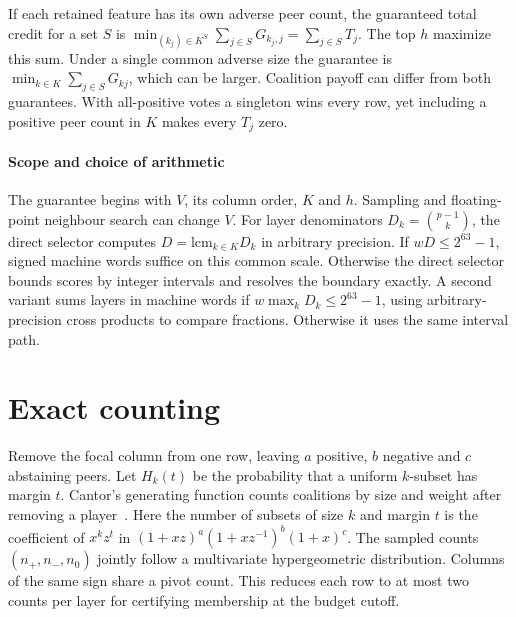 \documentclass{article}
\begin{document}
If each retained feature has its own adverse peer count, the guaranteed total credit for a set $S$ is $\min_{(k_j)\in K^S}\sum_{j\in S}G_{k_j,j}=\sum_{j\in S}T_j$. The top $h$ maximize this sum. Under a single common adverse size the guarantee is $\min_{k\in K}\sum_{j\in S}G_{kj}$, which can be larger. Coalition payoff can differ from both guarantees. With all-positive votes a singleton wins every row, yet including a positive peer count in $K$ makes every $T_j$ zero.

\paragraph{Scope and choice of arithmetic}
The guarantee begins with $V$, its column order, $K$ and $h$. Sampling and floating-point neighbour search can change $V$. For layer denominators $D_k=\binom{p-1}{k}$, the direct selector computes $D=\mathrm{lcm}_{k\in K}D_k$ in arbitrary precision. If $wD\le 2^{63}-1$, signed machine words suffice on this common scale. Otherwise the direct selector bounds scores by integer intervals and resolves the boundary exactly. A second variant sums layers in machine words if $w\max_k D_k\le 2^{63}-1$, using arbitrary-precision cross products to compare fractions. Otherwise it uses the same interval path.

\section{Exact counting}
Remove the focal column from one row, leaving $a$ positive, $b$ negative and $c$ abstaining peers. Let $H_k(t)$ be the probability that a uniform $k$-subset has margin $t$. Cantor's generating function counts coalitions by size and weight after removing a player~\citep[Prop.~1]{bilbao2000power}. Here the number of subsets of size $k$ and margin $t$ is the coefficient of $x^kz^t$ in $(1+xz)^a(1+xz^{-1})^b(1+x)^c$. The sampled counts $(n_+,n_-,n_0)$ jointly follow a multivariate hypergeometric distribution. Columns of the same sign share a pivot count. This reduces each row to at most two counts per layer for certifying membership at the budget cutoff.
\end{document}
